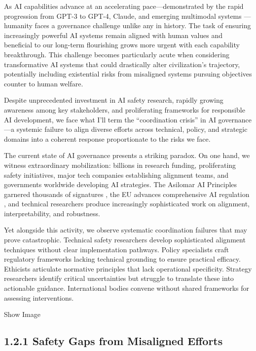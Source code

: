 \documentclass[
  11pt,
  letterpaper,
]{book}
\begin{document}
As AI capabilities advance at an accelerating pace---demonstrated by the
rapid progression from GPT-3 to GPT-4, Claude, and emerging multimodal
systems \textcite{maslej2025} \textcite{samborska2025}---humanity faces
a governance challenge unlike any in history. The task of ensuring
increasingly powerful AI systems remain aligned with human values and
beneficial to our long-term flourishing grows more urgent with each
capability breakthrough. This challenge becomes particularly acute when
considering transformative AI systems that could drastically alter
civilization's trajectory, potentially including existential risks from
misaligned systems pursuing objectives counter to human welfare.

Despite unprecedented investment in AI safety research, rapidly growing
awareness among key stakeholders, and proliferating frameworks for
responsible AI development, we face what I'll term the ``coordination
crisis'' in AI governance---a systemic failure to align diverse efforts
across technical, policy, and strategic domains into a coherent response
proportionate to the risks we face.

The current state of AI governance presents a striking paradox. On one
hand, we witness extraordinary mobilization: billions in research
funding, proliferating safety initiatives, major tech companies
establishing alignment teams, and governments worldwide developing AI
strategies. The Asilomar AI Principles garnered thousands of signatures
\textcite{tegmark2024}, the EU advances comprehensive AI regulation
\textcite{european2024}, and technical researchers produce increasingly
sophisticated work on alignment, interpretability, and robustness.

Yet alongside this activity, we observe systematic coordination failures
that may prove catastrophic. Technical safety researchers develop
sophisticated alignment techniques without clear implementation
pathways. Policy specialists craft regulatory frameworks lacking
technical grounding to ensure practical efficacy. Ethicists articulate
normative principles that lack operational specificity. Strategy
researchers identify critical uncertainties but struggle to translate
these into actionable guidance. International bodies convene without
shared frameworks for assessing interventions.

Show Image

\subsection{1.2.1 Safety Gaps from Misaligned
Efforts}\label{safety-gaps-from-misaligned-efforts}
\end{document}
